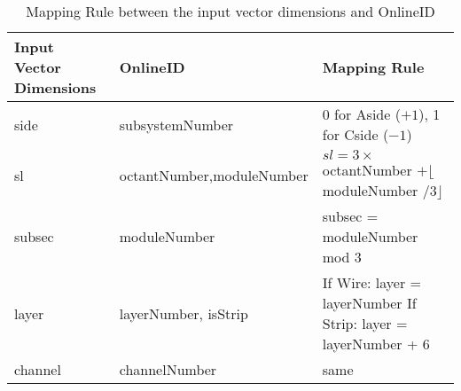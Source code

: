 \begin{table}[htbp]
  \centering
  \caption{Mapping Rule between the input vector dimensions and OnlineID}
  \label{tab:OnlineID_vs_vector}
  \begin{tabular}{|p{3cm}|p{4cm}|p{6cm}|}
    \hline
    \textbf{Input Vector \newline Dimensions} & \textbf{OnlineID} & \textbf{Mapping Rule} \\
    \hline
    side & subsystemNumber & 0 for Aside ($+1$), 1 for Cside ($-1$) \\
    \hline
    sl & octantNumber,\newline moduleNumber & $sl = 3 \times$ octantNumber \newline $+ \lfloor$moduleNumber $/ 3\rfloor$ \\
    \hline
    subsec & moduleNumber & subsec = moduleNumber mod 3 \\
    \hline
    layer & layerNumber, isStrip & If Wire: layer = layerNumber \newline If Strip: layer = layerNumber + 6 \\
    \hline
    channel & channelNumber & same \\
    \hline
  \end{tabular}
\end{table}